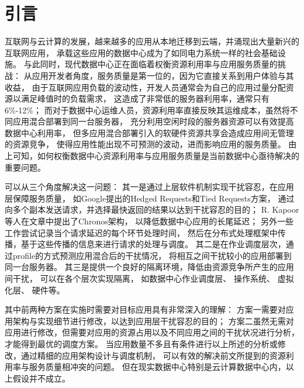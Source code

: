 

\chapter{引言}
\label{chap:intro}

互联网与云计算的发展，越来越多的应用从本地迁移到云端，并涌现出大量新兴的互联网应用，
承载这些应用的数据中心成为了如同电力系统一样的社会基础设施。
与此同时，现代数据中心正在面临着权衡资源利用率与应用服务质量的挑战：
从应用开发者角度，服务质量是第一位的，因为它直接关系到用户体验与其收益，
由于互联网应用负载的波动性，开发人员通常会为自己的应用过量分配资源以满足峰值时的负载需求，
这造成了非常低的服务器利用率，通常只有6\%-12\%；
而对于数据中心运维人员，资源利用率直接反映其运维成本，虽然将不同应用混合部署到同一台服务器，
充分利用空闲时段的服务器资源可以有效提高数据中心利用率，
但多应用混合部署引入的软硬件资源共享会造成应用间无管理的资源竞争，
使得应用性能出现不可预测的波动，进而影响应用的服务质量。
由上可知，如何权衡数据中心资源利用率与应用服务质量是当前数据中心亟待解决的重要问题。

可以从三个角度解决这一问题：
其一是通过上层软件机制实现干扰容忍，在应用层保障服务质量，
如Google提出的Hedged Requests和Tied Requests方案\cite{dean_tail_2013}，
通过向多个副本发送请求，并选择最快返回的结果以达到干扰容忍的目的；
R. Kapoor等人在文章\cite{Kapoor:2012:Chronos}中提出了Chronos架构，
以降低数据中心应用的长尾延迟；
另外一些工作\cite{timecard:2013, d2p:2014}尝试记录当个请求延迟的每个环节处理时间，
然后在分布式处理框架中传播，基于这些传播的信息来进行请求的处理与调度。
其二是在作业调度层次，通过profile的方式预测应用混合后的干扰情况，
将相互之间干扰较小的应用部署到同一台服务器\cite{mars_bubble-up:_2011, kambadur_measuring_2012}。
其三是提供一个良好的隔离环境，降低由资源竞争所产生的应用间干扰，
可以在各个层次实现隔离，
如数据中心作业调度层\cite{Hindman:2011:Mesos, Schwarzkopf_omega_2013, borg:2015}、
操作系统\cite{cgroup, lin_gaining_2008, tam_managing_2007, liu_software_2012, Liu:2014:ISCA}、
虚拟化层\cite{Xu:2013:Bobtail:, Xu:2013:SMALL}、
硬件\cite{kasture_ubik:_2014, sanchez_vantage:_2011, sanchez_zcache:_2010, qureshi_utility-based_2006, muralidhara_reducing_2011}等。


其中前两种方案在实施时需要对目标应用具有非常深入的理解：
方案一需要对应用架构与实现细节进行修改，以达到应用层干扰容忍的目的；
方案二虽然无需对应用进行修改，但需要对应用的资源占用以及不同应用之间的干扰状况进行分析，
才能得到最优的调度方案。
当应用数量不多且有条件进行以上所述的分析或修改，通过精细的应用架构设计与调度机制，
可以有效的解决前文所提到的资源利用率与服务质量相冲突的问题。
但在现实数据中心特别是云计算数据中心内，以上假设并不成立。

